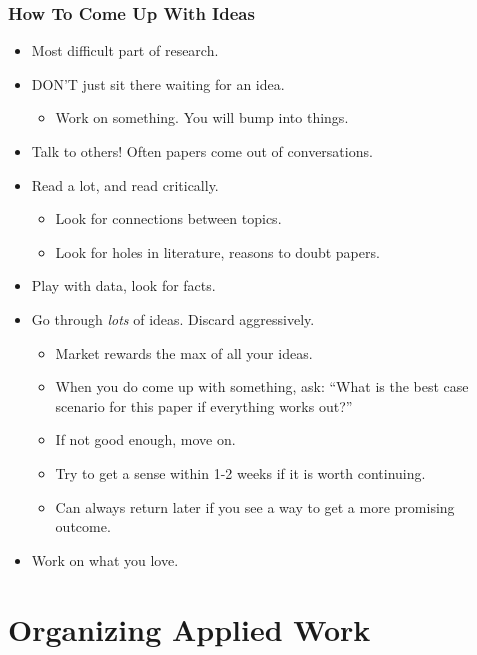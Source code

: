 \documentclass[english,xcolor=svgnames]{beamer}
\begin{document}
\begin{frame}
\frametitle[alignment=center]{How To Come Up With Ideas}
\begin{itemize}
	\item Most difficult part of research.
	\item DON'T just sit there waiting for an idea.
	\begin{itemize}
		\item Work on something. You will bump into things.
	\end{itemize}
	\item Talk to others! Often papers come out of conversations.
	\item Read a lot, and read critically.
	\begin{itemize}
		\item Look for connections between topics.
		\item Look for holes in literature, reasons to doubt papers.
	\end{itemize}
	\item Play with data, look for facts.
	\item Go through \emph{lots} of ideas. Discard aggressively.
	\begin{itemize}
		\item Market rewards the max of all your ideas.
		\item When you do come up with something, ask: ``What is the best case scenario for this paper if everything works out?''
		\item If not good enough, move on. 
		\item Try to get a sense within 1-2 weeks if it is worth continuing. 
		\item Can always return later if you see a way to get a more promising outcome.
	\end{itemize}
	\item Work on what you love.
\end{itemize}
\end{frame}

\section{Organizing Applied Work}
\end{document}
